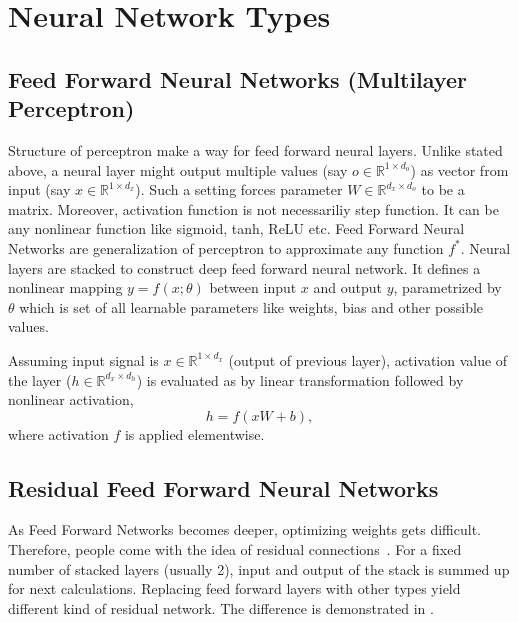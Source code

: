 \section{Neural Network Types}
\label{sec:nnet_types}

\subsection{Feed Forward Neural Networks (Multilayer Perceptron)}

Structure of perceptron make a way for feed forward neural layers. 
Unlike stated above, a neural layer might output multiple values (say $o \in \mathbb{R}^{1 \times d_o}$) as vector from input (say $x \in \mathbb{R}^{1 \times d_x}$). 
Such a setting forces parameter $W \in \mathbb{R}^{d_x \times d_o} $ to be a matrix. 
Moreover, activation function is not necessariliy step function. 
It can be any nonlinear function like sigmoid, tanh, ReLU etc. 
Feed Forward Neural Networks are generalization of perceptron to approximate any function $f^*$. 
Neural layers are stacked to construct deep feed forward neural network. 
It defines a nonlinear mapping $y=f(x;\theta)$ between input $x$ and output $y$, parametrized by $\theta$ which is set of all learnable parameters like weights, bias and other possible values.

Assuming input signal is $x \in \mathbb{R}^{1 \times d_x}$ (output of previous layer), 
activation value of the layer ($h \in \mathbb{R}^{d_x \times d_h}$) is evaluated as by linear transformation followed by nonlinear activation, 
\begin{equation}
\label{eqn:mlpact}
h = f (x W + b),
\end{equation}
where activation $f$ is applied elementwise.

\subsection{Residual Feed Forward Neural Networks}

As Feed Forward Networks becomes deeper, optimizing weights gets difficult. 
Therefore, people come with the idea of residual connections~\cite{he_deep_2015}. 
For a fixed number of stacked layers (usually 2), input and output of the stack is summed up for next calculations. 
Replacing feed forward layers with other types yield different kind of residual network. 
The difference is demonstrated in . 

